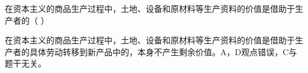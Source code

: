 \question 在资本主义的商品生产过程中，土地、设备和原材料等生产资料的价值是借助于生产者的（
）
\par{}
\begin{solution}在资本主义的商品生产过程中，土地、设备和原材料等生产资料的价值是借助于生产者的具体劳动转移到新产品中的，本身不产生剩余价值。A，D观点错误，C与题干无关。
\end{solution}
